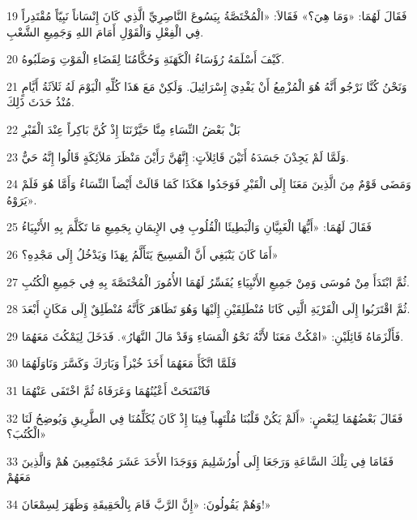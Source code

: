 \par 19 فَقَالَ لَهُمَا: «وَمَا هِيَ؟» فَقَالاَ: «الْمُخْتَصَّةُ بِيَسُوعَ النَّاصِرِيِّ الَّذِي كَانَ إِنْسَاناً نَبِيّاً مُقْتَدِراً فِي الْفِعْلِ وَالْقَوْلِ أَمَامَ اللهِ وَجَمِيعِ الشَّعْبِ.
\par 20 كَيْفَ أَسْلَمَهُ رُؤَسَاءُ الْكَهَنَةِ وَحُكَّامُنَا لِقَضَاءِ الْمَوْتِ وَصَلَبُوهُ.
\par 21 وَنَحْنُ كُنَّا نَرْجُو أَنَّهُ هُوَ الْمُزْمِعُ أَنْ يَفْدِيَ إِسْرَائِيلَ. وَلَكِنْ مَعَ هَذَا كُلِّهِ الْيَوْمَ لَهُ ثَلاَثَةُ أَيَّامٍ مُنْذُ حَدَثَ ذَلِكَ.
\par 22 بَلْ بَعْضُ النِّسَاءِ مِنَّا حَيَّرْنَنَا إِذْ كُنَّ بَاكِراً عِنْدَ الْقَبْرِ
\par 23 وَلَمَّا لَمْ يَجِدْنَ جَسَدَهُ أَتَيْنَ قَائِلاَتٍ: إِنَّهُنَّ رَأَيْنَ مَنْظَرَ مَلاَئِكَةٍ قَالُوا إِنَّهُ حَيٌّ.
\par 24 وَمَضَى قَوْمٌ مِنَ الَّذِينَ مَعَنَا إِلَى الْقَبْرِ فَوَجَدُوا هَكَذَا كَمَا قَالَتْ أَيْضاً النِّسَاءُ وَأَمَّا هُوَ فَلَمْ يَرَوْهُ».
\par 25 فَقَالَ لَهُمَا: «أَيُّهَا الْغَبِيَّانِ وَالْبَطِيئَا الْقُلُوبِ فِي الإِيمَانِ بِجَمِيعِ مَا تَكَلَّمَ بِهِ الأَنْبِيَاءُ
\par 26 أَمَا كَانَ يَنْبَغِي أَنَّ الْمَسِيحَ يَتَأَلَّمُ بِهَذَا وَيَدْخُلُ إِلَى مَجْدِهِ؟»
\par 27 ثُمَّ ابْتَدَأَ مِنْ مُوسَى وَمِنْ جَمِيعِ الأَنْبِيَاءِ يُفَسِّرُ لَهُمَا الأُمُورَ الْمُخْتَصَّةَ بِهِ فِي جَمِيعِ الْكُتُبِ.
\par 28 ثُمَّ اقْتَرَبُوا إِلَى الْقَرْيَةِ الَّتِي كَانَا مُنْطَلِقَيْنِ إِلَيْهَا وَهُوَ تَظَاهَرَ كَأَنَّهُ مُنْطَلِقٌ إِلَى مَكَانٍ أَبْعَدَ.
\par 29 فَأَلْزَمَاهُ قَائِلَيْنِ: «امْكُثْ مَعَنَا لأَنَّهُ نَحْوُ الْمَسَاءِ وَقَدْ مَالَ النَّهَارُ». فَدَخَلَ لِيَمْكُثَ مَعَهُمَا.
\par 30 فَلَمَّا اتَّكَأَ مَعَهُمَا أَخَذَ خُبْزاً وَبَارَكَ وَكَسَّرَ وَنَاوَلَهُمَا
\par 31 فَانْفَتَحَتْ أَعْيُنُهُمَا وَعَرَفَاهُ ثُمَّ اخْتَفَى عَنْهُمَا
\par 32 فَقَالَ بَعْضُهُمَا لِبَعْضٍ: «أَلَمْ يَكُنْ قَلْبُنَا مُلْتَهِباً فِينَا إِذْ كَانَ يُكَلِّمُنَا فِي الطَّرِيقِ وَيُوضِحُ لَنَا الْكُتُبَ؟»
\par 33 فَقَامَا فِي تِلْكَ السَّاعَةِ وَرَجَعَا إِلَى أُورُشَلِيمَ وَوَجَدَا الأَحَدَ عَشَرَ مُجْتَمِعِينَ هُمْ وَالَّذِينَ مَعَهُمْ
\par 34 وَهُمْ يَقُولُونَ: «إِنَّ الرَّبَّ قَامَ بِالْحَقِيقَةِ وَظَهَرَ لِسِمْعَانَ!»
